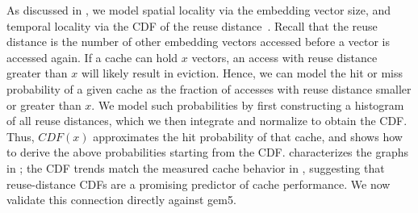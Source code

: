 As discussed in , we model spatial locality via the embedding vector size, and temporal locality via the CDF of the reuse distance~\cite{ding2003pldi}. Recall that the reuse distance is the number of other embedding vectors accessed before a vector is accessed again. If a cache can hold $x$ vectors, an access with reuse distance greater than $x$ will likely result in eviction. Hence, we can model the hit or miss probability of a given cache as the fraction of accesses with reuse distance smaller or greater than $x$. We model such probabilities by first constructing a histogram of all reuse distances, which we then integrate and normalize to obtain the CDF. Thus, $CDF(x)$ approximates the hit probability of that cache, and  shows how to derive the above probabilities starting from the CDF.  characterizes the graphs in ; the CDF trends match the measured cache behavior in , suggesting that reuse-distance CDFs are a promising predictor of cache performance. We now validate this connection directly against gem5.

